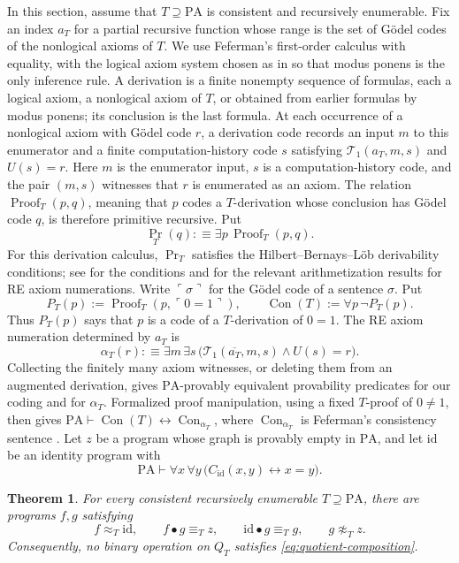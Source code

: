 \documentclass[11pt]{article}
\newtheorem{theorem}{Theorem}
\newcommand{\PA}{\mathrm{PA}}
\newcommand{\Con}{\operatorname{Con}}
\newcommand{\Proof}{\operatorname{Proof}}
\begin{document}
In this section, assume that $T\supseteq\PA$ is consistent and recursively
enumerable. Fix an index
$a_T$ for a partial recursive function whose range is the set of G\"odel
codes of the nonlogical axioms of $T$.
We use Feferman's first-order calculus with equality, with the
logical axiom system chosen as in \cite[p.~266]{Feferman} so that
modus ponens is the only inference rule.
A derivation is a finite nonempty sequence of formulas, each a
logical axiom, a nonlogical axiom of $T$, or obtained from earlier
formulas by modus ponens; its conclusion is the last formula.
At each occurrence of a nonlogical
axiom with G\"odel code $r$, a derivation code records an input $m$ to this
enumerator and a finite computation-history code $s$ satisfying
$\mathcal{T}_1(a_T,m,s)$ and $U(s)=r$. Here $m$ is the enumerator input, $s$ is a
computation-history code, and the pair $(m,s)$ witnesses that $r$ is
enumerated as an axiom. The relation $\Proof_T(p,q)$, meaning
that $p$ codes a $T$-derivation whose conclusion has G\"odel code $q$, is
therefore primitive recursive. Put
\[
 \operatorname{Pr}_T(q):\!\equiv\exists p\,\Proof_T(p,q).
\]
For this derivation calculus, $\operatorname{Pr}_T$ satisfies the
Hilbert--Bernays--L\"ob derivability conditions; see
\cite[pp.~115--116]{Lob} for the conditions and
\cite[pp.~269--271, especially Theorems~2.4(i) and~2.8]{Feferman}
for the relevant arithmetization results for RE axiom numerations.
Write
$\ulcorner\sigma\urcorner$ for the G\"odel code of a sentence $\sigma$. Put
\[
 P_T(p):=\Proof_T(p,\ulcorner0=1\urcorner),
 \qquad
 \Con(T):=\forall p\,\neg P_T(p).
\]
Thus $P_T(p)$ says that $p$ is a code of a $T$-derivation of $0=1$.
The RE axiom numeration determined by $a_T$ is
\[
 \alpha_T(r):\!\equiv
 \exists m\,\exists s\,
 \bigl(\mathcal{T}_1(\overline{a_T},m,s)\land U(s)=r\bigr).
\]
Collecting the finitely many axiom witnesses, or deleting them
from an augmented derivation, gives $\PA$-provably equivalent
provability predicates for our coding and for $\alpha_T$.
Formalized proof manipulation, using a fixed $T$-proof of
$0\ne1$, then gives
$\PA\vdash\Con(T)\leftrightarrow\Con_{\alpha_T}$,
where $\Con_{\alpha_T}$ is Feferman's consistency sentence
\cite[p.~269]{Feferman}.
Let $z$ be a program whose graph is provably empty in $\PA$, and
let $\mathrm{id}$ be an identity program with
\[
 \PA\vdash\forall x\,\forall y\,
 \bigl(C_{\mathrm{id}}(x,y)\longleftrightarrow x=y\bigr).
\]

\begin{theorem}\label{thm:obstruction}
For every consistent recursively enumerable $T\supseteq\PA$, there are
programs $f,g$ satisfying
\begin{equation}\label{eq:obstruction-properties}
 f\approx_T\mathrm{id},\qquad
 f\bullet g\equiv_T z,\qquad
 \mathrm{id}\bullet g\equiv_T g,\qquad
 g\not\approx_T z.
\end{equation}
Consequently, no binary operation on $Q_T$ satisfies
\eqref{eq:quotient-composition}.
\end{theorem}
\end{document}
